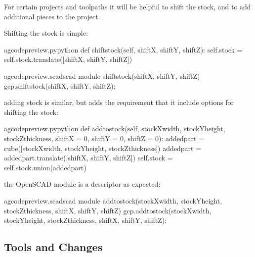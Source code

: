\documentclass{ltxdoc}
\begin{document}
For certain projects and toolpaths it will be helpful to shift the stock, and to add additional pieces to the project.

Shifting the stock is simple:

\lstset{firstnumber=\thegcpy}
\begin{writecode}{a}{gcodepreview.py}{python}
    def shiftstock(self, shiftX, shiftY, shiftZ):
         self.stock = self.stock.translate([shiftX, shiftY, shiftZ])
        
\end{writecode}
\addtocounter{gcpy}{3}

\lstset{firstnumber=\thegcpscad}
\begin{writecode}{a}{gcodepreview.scad}{scad}
module shiftstock(shiftX, shiftY, shiftZ) {
    gcp.shiftstock(shiftX, shiftY, shiftZ);
}

\end{writecode}
\addtocounter{gcpscad}{4}

\noindent adding stock is similar, but adds the requirement that it include options for shifting the stock:

\lstset{firstnumber=\thegcpy}
\begin{writecode}{a}{gcodepreview.py}{python}
    def addtostock(self, stockXwidth, stockYheight, stockZthickness, 
                         shiftX = 0, 
                         shiftY = 0, 
                         shiftZ = 0):
         addedpart = cube([stockXwidth, stockYheight, stockZthickness])
         addedpart = addedpart.translate([shiftX, shiftY, shiftZ])
         self.stock = self.stock.union(addedpart)
        
\end{writecode}
\addtocounter{gcpy}{8}

\noindent the OpenSCAD module is a descriptor as expected:

\lstset{firstnumber=\thegcpscad}
\begin{writecode}{a}{gcodepreview.scad}{scad}
module addtostock(stockXwidth, stockYheight, stockZthickness, shiftX, shiftY, shiftZ) {
    gcp.addtostock(stockXwidth, stockYheight, stockZthickness, shiftX, shiftY, shiftZ);
}

\end{writecode}
\addtocounter{gcpscad}{4}

\subsection{Tools and Changes}
\end{document}
